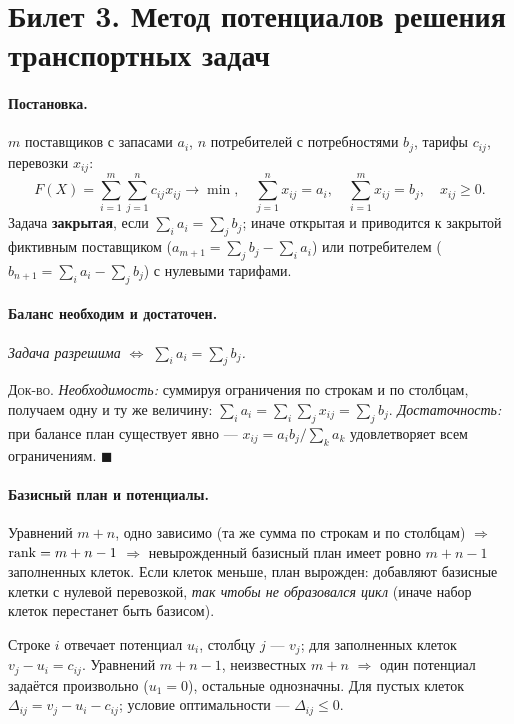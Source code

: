 \section{Билет 3. Метод потенциалов решения транспортных задач}


\paragraph{Постановка.}
$m$ поставщиков с запасами $a_i$, $n$ потребителей с потребностями $b_j$,
тарифы $c_{ij}$, перевозки $x_{ij}$:
\[
  F(X) = \sum_{i=1}^{m}\sum_{j=1}^{n} c_{ij}x_{ij} \to \min , \quad
  \sum_{j=1}^{n} x_{ij} = a_i , \quad
  \sum_{i=1}^{m} x_{ij} = b_j , \quad x_{ij} \ge 0 .
\]
Задача \textbf{закрытая}, если $\sum_i a_i = \sum_j b_j$; иначе открытая и
приводится к закрытой фиктивным поставщиком ($a_{m+1} = \sum_j b_j - \sum_i a_i$)
или потребителем ($b_{n+1} = \sum_i a_i - \sum_j b_j$) с нулевыми тарифами.

\paragraph{Баланс необходим и достаточен.}
\textit{Задача разрешима $\iff$ $\sum_i a_i = \sum_j b_j$.}

\textsc{Док-во.} \emph{Необходимость:} суммируя ограничения по строкам и по
столбцам, получаем одну и ту же величину:
$\sum_i a_i = \sum_i\sum_j x_{ij} = \sum_j b_j$.
\emph{Достаточность:} при балансе план существует явно —
$x_{ij} = a_i b_j / \sum_k a_k$ удовлетворяет всем ограничениям.
$\blacksquare$

\paragraph{Базисный план и потенциалы.}
Уравнений $m+n$, одно зависимо (та же сумма по строкам и по столбцам)
$\Rightarrow$ $\operatorname{rank} = m+n-1$ $\Rightarrow$ невырожденный базисный план имеет
ровно $m+n-1$ заполненных клеток. Если клеток меньше, план вырожден: добавляют
базисные клетки с нулевой перевозкой, \emph{так чтобы не образовался цикл}
(иначе набор клеток перестанет быть базисом).

Строке $i$ отвечает потенциал $u_i$, столбцу $j$ — $v_j$; для заполненных
клеток $v_j - u_i = c_{ij}$. Уравнений $m+n-1$, неизвестных $m+n$
$\Rightarrow$ один потенциал задаётся произвольно ($u_1 = 0$), остальные
однозначны. Для пустых клеток $\Delta_{ij} = v_j - u_i - c_{ij}$; условие
оптимальности — $\Delta_{ij} \le 0$.

